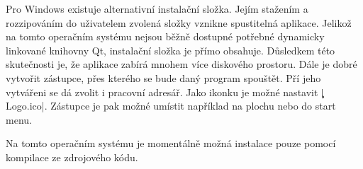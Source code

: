 Pro Windows existuje alternativní instalační složka. Jejím stažením a rozzipováním do uživatelem zvolená složky vznikne spustitelná aplikace. 
Jelikož na tomto operačním systému nejsou běžně dostupné potřebné dynamicky linkované knihovny Qt,
instalační složka je přímo obsahuje.
Důsledkem této skutečnosti je, že aplikace zabírá mnohem více diskového prostoru.
Dále je dobré vytvořit zástupce, přes kterého se bude daný program spouštět.
Pří jeho vytvářeni se dá zvolit i pracovní adresář.
Jako ikonku je možné nastavit \c|Logo.ico|.
Zástupce je pak možné umístit například na plochu nebo do start menu.

Na tomto operačním systému je momentálně možná instalace pouze pomocí kompilace ze zdrojového kódu.


